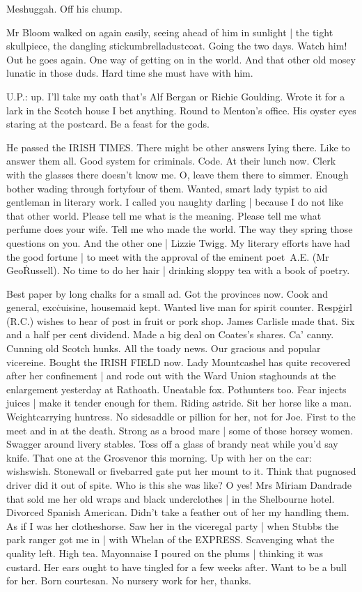 Meshuggah.
Off his chump.

Mr Bloom walked on again easily,
seeing ahead of him in sunlight |
the tight skullpiece,
the dangling stickumbrelladustcoat.
Going the two days.
Watch him!
Out he goes again.
One way of getting on in the world.
And that other old mosey lunatic in those duds.
Hard time she must have with him.

U.P.:
up.
I'll take my oath that's Alf Bergan or Richie Goulding.
Wrote it for a lark in the Scotch house I bet anything.
Round to Menton's office.
His oyster eyes staring at the postcard.
Be a feast for the gods.

He passed the IRISH TIMES.
There might be other answers Iying there.
Like to answer them all.
Good system for criminals.
Code.
At their lunch now.
Clerk with the glasses there doesn't know me.
O, leave them there to simmer.
Enough bother wading through fortyfour of them.
Wanted,
smart lady typist to aid gentleman in literary work.
I called you naughty darling |
because I do not like that other world.
Please tell me what is the meaning.
Please tell me what perfume does your wife.
Tell me who made the world.
The way they spring those questions on you.
And the other one |
Lizzie Twigg.
My literary efforts have had the good fortune |
to meet with the approval of the eminent poet~A.E.
(Mr Geo\. Russell).
No time to do her hair |
drinking sloppy tea with a book of poetry.

Best paper by long chalks for a small ad.
Got the provinces now.
Cook and general,
exc\. cuisine,
housemaid kept.
Wanted live man for spirit counter.
Resp\. girl (R.C.) wishes to hear of post in fruit or pork shop.
James Carlisle made that.
Six and a half per cent dividend.
Made a big deal on Coates's shares.
Ca' canny.
Cunning old Scotch hunks.
All the toady news.
Our gracious and popular vicereine.
Bought the IRISH FIELD now.
Lady Mountcashel has quite recovered after her confinement |
and rode out with the Ward Union staghounds at the enlargement yesterday at Rathoath.
Uneatable fox.
Pothunters too.
Fear injects juices |
make it tender enough for them.
Riding astride.
Sit her horse like a man.
Weightcarrying huntress.
No sidesaddle or pillion for her,
not for Joe.
First to the meet and in at the death.
Strong as a brood mare |
some of those horsey women.
Swagger around livery stables.
Toss off a glass of brandy neat while you'd say knife.
That one at the Grosvenor this morning.
Up with her on the car:
wishswish.
Stonewall or fivebarred gate put her mount to it.
Think that pugnosed driver did it out of spite.
Who is this she was like?
O yes!
Mrs Miriam Dandrade that sold me her old wraps and black underclothes |
in the Shelbourne hotel.
Divorced Spanish American.
Didn't take a feather out of her my handling them.
As if I was her clotheshorse.
Saw her in the viceregal party |
when Stubbs the park ranger got me in |
with Whelan of the EXPRESS.
Scavenging what the quality left.
High tea.
Mayonnaise I poured on the plums |
thinking it was custard.
Her ears ought to have tingled for a few weeks after.
Want to be a bull for her.
Born courtesan.
No nursery work for her, thanks.

